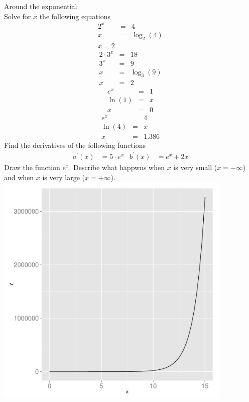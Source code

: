 \documentclass[a4paper]{report}
\begin{document}
\begin{Answer}[ref=exexln]
\Question Around the exponential\\ 
\subQuestion Solve for $x$ the following equations
\begin{eqnarray*}
2^x&=&4\\
x&=&\log_2(4)\\
x=2
\end{eqnarray*}
\begin{eqnarray*}
2 \cdot 3^x &=&18\\
3^x&=&9\\
x&=& \log_3(9)\\
x&=&2
\end{eqnarray*}
\begin{eqnarray*}
e^x &=&1\\
\ln(1)&=&x\\
x&=&0
\end{eqnarray*}
\begin{eqnarray*}
e^x &=&4\\
\ln(4)&=&x\\
x&=&1.386
\end{eqnarray*}
\subQuestion Find the derivatives of the following functions
\begin{align*}
a^\prime(x) &= 5\cdot e^x			&  b^\prime(x)&=e^x + 2x 
\end{align*}
\subQuestion Draw the function $e^x$. Describe what happwns when $x$ is very small ($x=- \infty$) and when $x$ is very large ($x=+\infty$).\\
\includegraphics[width=0.85\textwidth]{exponential_plot.pdf}\\

\end{Answer}
\end{document}
